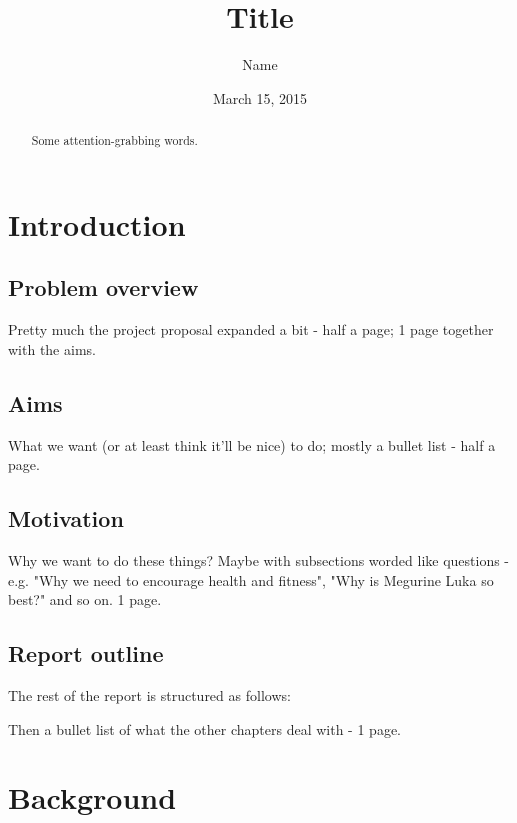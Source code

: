 \documentclass{l4proj}
\begin{document}
\title{Title}
\author{Name}
\date{March 15, 2015}
\maketitle
 
\begin{abstract}
Some attention-grabbing words.
\end{abstract}
 
\educationalconsent
\tableofcontents
 
 
\chapter{Introduction}
 
\section{Problem overview}
Pretty much the project proposal expanded a bit - half a page; 1 page together with the aims.
 
\section{Aims}
What we want (or at least think it'll be nice) to do; mostly a bullet list - half a page.
 
\section{Motivation}
Why we want to do these things? Maybe with subsections worded like questions - e.g. "Why we need to encourage health and fitness", "Why is Megurine Luka so best?" and so on. 1 page.
 
\section{Report outline}
The rest of the report is structured as follows:
 
Then a bullet list of what the other chapters deal with - 1 page.
 
 
\chapter{Background}
 
\end{document}
